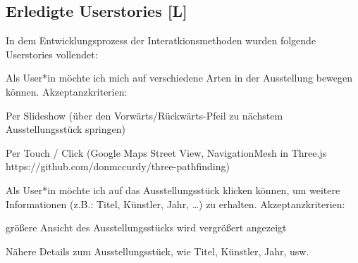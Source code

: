 \subsection{Erledigte Userstories [L]}
In dem Entwicklungsprozess der Interatkionsmethoden wurden folgende Userstories vollendet:

\begin{compactenum}       
  \item Als User*in möchte ich mich auf verschiedene Arten in der Ausstellung bewegen können. Akzeptanzkriterien:
  \begin{compactitem}
      \item Per Slideshow (über den Vorwärts/Rückwärts-Pfeil zu nächstem Ausstellungsstück springen)
      \item Per Touch / Click (Google Maps Street View, NavigationMesh in Three.js https://github.com/donmccurdy/three-pathfinding)
  \end{compactitem}
  \item  Als User*in möchte ich auf das Ausstellungsstück klicken können, um weitere Informationen (z.B.: Titel, Künstler, Jahr, …) zu erhalten. Akzeptanzkriterien:
  \begin{compactitem}
      \item größere Ansicht des Ausstellungsstücks wird vergrößert angezeigt
      \item Nähere Details zum Ausstellungsstück, wie Titel, Künstler, Jahr, usw.
  \end{compactitem}
\end{compactenum}